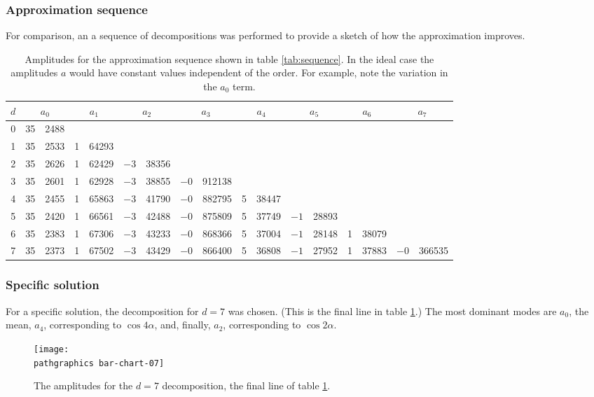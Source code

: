 \subsubsection{Approximation sequence}
For comparison, an a sequence of decompositions was performed to provide a sketch of how the approximation improves.
\begin{table}[htp]
	\begin{center}
		\begin{tabular}{rr@{.}lr@{.}lr@{.}lr@{.}lr@{.}lr@{.}lr@{.}lr@{.}l}
			$d$ & \multicolumn{2}{c}{$a_{0}$} & \multicolumn{2}{c}{$a_{1}$} & \multicolumn{2}{c}{$a_{2}$} & \multicolumn{2}{c}{$a_{3}$} & \multicolumn{2}{c}{$a_{4}$} & \multicolumn{2}{c}{$a_{5}$} & \multicolumn{2}{c}{$a_{6}$} & \multicolumn{2}{c}{$a_{7}$} \\\hline
			0 & 35 & 2488 \\
			1 & 35 & 2533 & 1 & 64293 \\
			2 & 35 & 2626 & 1 & 62429 & $-3$ & 38356  \\
			3 & 35 & 2601 & 1 & 62928 & $-3$ & 38855 & $-0$ & 912138  \\
			4 & 35 & 2455 & 1 & 65863 & $-3$ & 41790 & $-0$ & 882795 & 5 & 38447  \\
			5 & 35 & 2420 & 1 & 66561 & $-3$ & 42488 & $-0$ & 875809 & 5 & 37749 & $-1$ & 28893  \\
			6 & 35 & 2383 & 1 & 67306 & $-3$ & 43233 & $-0$ & 868366 & 5 & 37004 & $-1$ & 28148 & 1 & 38079  \\
			7 & 35 & 2373 & 1 & 67502 & $-3$ & 43429 & $-0$ & 866400 & 5 & 36808 & $-1$ & 27952 & 1 & 37883 & $-0$ & 366535 \\
		\end{tabular}
	\end{center}
\caption{Amplitudes for the approximation sequence shown in table \ref{tab:sequence}. In the ideal case the amplitudes $a$ would have constant values independent of the order. For example, note the variation in the $a_{0}$ term.}
\label{tab:amplitudes}
\end{table}%

\subsubsection{Specific solution}
For a specific solution, the decomposition for $d=7$ was chosen. (This is the final line in table \ref{tab:amplitudes}.)
The most dominant modes are $a_{0}$, the mean, $a_{4}$, corresponding to $\cos 4\alpha$, and, finally, $a_{2}$, corresponding to $\cos 2\alpha$.
\begin{figure}[htbp]
	\begin{center}
		\texttt{[image: \\pathgraphics bar-chart-07]}
	\end{center}
\caption{The amplitudes for the $d=7$ decomposition, the final line of table \ref{tab:amplitudes}.}
\label{fig:sample-data}
\end{figure}

